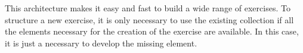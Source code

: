 This architecture makes it easy and fast to build a wide range of exercises. To structure a new exercise, it is only necessary to use the existing collection if all the elements necessary for the creation of the exercise are available. In this case, it is just a necessary to develop the missing element.






